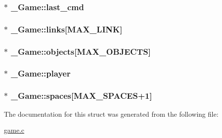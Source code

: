 \subsubsection[{\texorpdfstring{last\+\_\+cmd}{last_cmd}}]{$\ast$ \+\_\+\+Game\+::last\+\_\+cmd}\hypertarget{struct__Game_a6dd34045346b3ea8dd1a4e3f08ab71c5}{}\label{struct__Game_a6dd34045346b3ea8dd1a4e3f08ab71c5}
\subsubsection[{\texorpdfstring{links}{links}}]{$\ast$ \+\_\+\+Game\+::links\mbox{[}{\bf M\+A\+X\+\_\+\+L\+I\+NK}\mbox{]}}\hypertarget{struct__Game_aa4ff88aaf2a54616e5863609effad94e}{}\label{struct__Game_aa4ff88aaf2a54616e5863609effad94e}
\subsubsection[{\texorpdfstring{objects}{objects}}]{$\ast$ \+\_\+\+Game\+::objects\mbox{[}{\bf M\+A\+X\+\_\+\+O\+B\+J\+E\+C\+TS}\mbox{]}}\hypertarget{struct__Game_ad45bf5645a26e546d0060a2e61f9cf81}{}\label{struct__Game_ad45bf5645a26e546d0060a2e61f9cf81}
\subsubsection[{\texorpdfstring{player}{player}}]{$\ast$ \+\_\+\+Game\+::player}\hypertarget{struct__Game_a31406605782d71ec00c4bf258ea76267}{}\label{struct__Game_a31406605782d71ec00c4bf258ea76267}
\subsubsection[{\texorpdfstring{spaces}{spaces}}]{$\ast$ \+\_\+\+Game\+::spaces\mbox{[}{\bf M\+A\+X\+\_\+\+S\+P\+A\+C\+ES}+1\mbox{]}}\hypertarget{struct__Game_ab4180417d9148f8abb2233ca6c4ecfe5}{}\label{struct__Game_ab4180417d9148f8abb2233ca6c4ecfe5}


The documentation for this struct was generated from the following file\+:\begin{DoxyCompactItemize}
\item 
\hyperlink{game_8c}{game.\+c}\end{DoxyCompactItemize}
